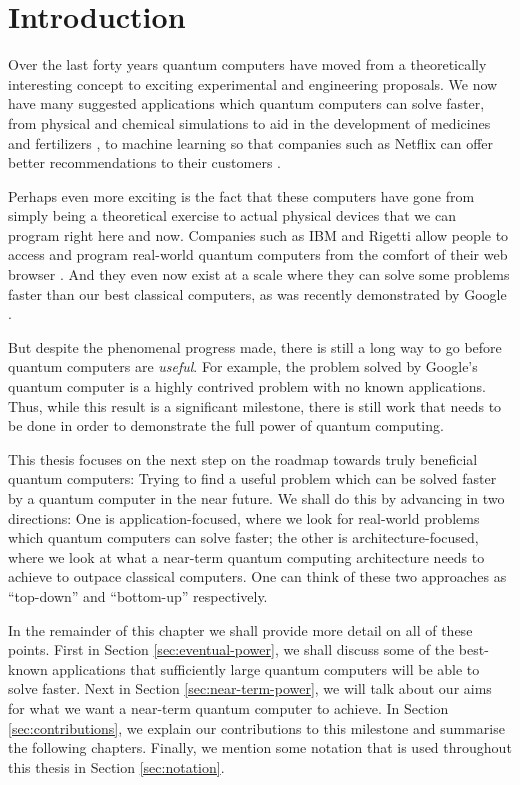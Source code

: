 \chapter{Introduction}

Over the last forty years quantum computers have moved from a theoretically interesting concept to exciting experimental and engineering proposals. We now have many suggested applications which quantum computers can solve faster, from physical and chemical simulations to aid in the development of medicines and fertilizers \cite{berry2019}, to machine learning so that companies such as Netflix can offer better recommendations to their customers \cite{kerenidis2017}.

Perhaps even more exciting is the fact that these computers have gone from simply being a theoretical exercise to actual physical devices that we can program right here and now. Companies such as IBM and Rigetti allow people to access and program real-world quantum computers from the comfort of their web browser \cite{ibm, rigetti}. And they even now exist at a scale where they can solve some problems faster than our best classical computers, as was recently demonstrated by Google \cite{arute2019}.

But despite the phenomenal progress made, there is still a long way to go before quantum computers are \emph{useful}. For example, the problem solved by Google's quantum computer is a highly contrived problem with no known applications. Thus, while this result is a significant milestone, there is still work that needs to be done in order to demonstrate the full power of quantum computing.

This thesis focuses on the next step on the roadmap towards truly beneficial quantum computers: Trying to find a useful problem which can be solved faster by a quantum computer in the near future. We shall do this by advancing in two directions: One is application-focused, where we look for real-world problems which quantum computers can solve faster; the other is architecture-focused, where we look at what a near-term quantum computing architecture needs to achieve to outpace classical computers. One can think of these two approaches as ``top-down'' and ``bottom-up'' respectively.

In the remainder of this chapter we shall provide more detail on all of these points. First in Section \ref{sec:eventual-power}, we shall discuss some of the best-known applications that sufficiently large quantum computers will be able to solve faster. Next in Section \ref{sec:near-term-power}, we will talk about our aims for what we want a near-term quantum computer to achieve. In Section \ref{sec:contributions}, we explain our contributions to this milestone and summarise the following chapters. Finally, we mention some notation that is used throughout this thesis in Section \ref{sec:notation}.


